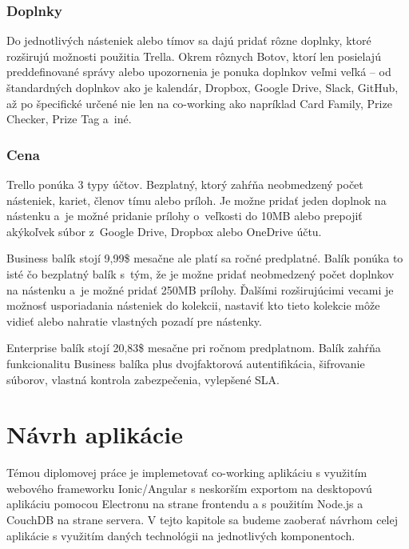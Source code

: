 \subsubsection{Doplnky}
\indent Do jednotlivých násteniek alebo tímov sa dajú pridať rôzne doplnky, ktoré rozširujú možnosti použitia Trella. Okrem rôznych Botov, ktorí len posielajú preddefinované správy alebo upozornenia je ponuka doplnkov veľmi veľká – od štandardných doplnkov ako je kalendár, Dropbox, Google Drive, Slack, GitHub, až po špecifické určené nie len na co-working ako napríklad Card Family, Prize Checker, Prize Tag a iné. 
\subsubsection{Cena}
\indent Trello ponúka 3 typy účtov. Bezplatný, ktorý zahŕňa neobmedzený počet násteniek, kariet, členov tímu alebo príloh. Je možne pridať jeden doplnok na nástenku a je možné pridanie prílohy o veľkosti do 10MB alebo prepojiť akýkoľvek súbor z Google Drive, Dropbox alebo OneDrive účtu. 

\indent Business balík stojí 9,99\$ mesačne ale platí sa ročné predplatné. Balík ponúka to isté čo bezplatný balík s tým, že je možne pridať neobmedzený počet doplnkov na nástenku a je možné pridať 250MB prílohy. Ďalšími rozširujúcimi vecami je možnosť usporiadania násteniek do kolekcii, nastaviť kto tieto kolekcie môže vidieť alebo nahratie vlastných pozadí pre nástenky. 

\indent Enterprise balík stojí 20,83\$ mesačne pri ročnom predplatnom. Balík zahŕňa funkcionalitu Business balíka plus dvojfaktorová autentifikácia, šifrovanie súborov, vlastná kontrola zabezpečenia, vylepšené SLA. 

\section{Návrh aplikácie}
\indent Témou diplomovej práce je implemetovať co-working aplikáciu s využitím webového frameworku Ionic/Angular s neskorším exportom na desktopovú aplikáciu pomocou Electronu na strane frontendu a s použitím Node.js a CouchDB na strane servera. V tejto kapitole sa budeme zaoberať návrhom celej aplikácie s využitím daných technológii na jednotlivých komponentoch. 

